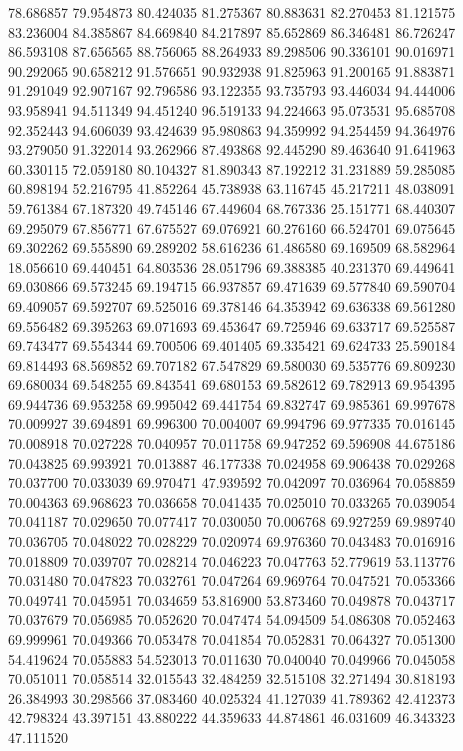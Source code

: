 78.686857
79.954873
80.424035
81.275367
80.883631
82.270453
81.121575
83.236004
84.385867
84.669840
84.217897
85.652869
86.346481
86.726247
86.593108
87.656565
88.756065
88.264933
89.298506
90.336101
90.016971
90.292065
90.658212
91.576651
90.932938
91.825963
91.200165
91.883871
91.291049
92.907167
92.796586
93.122355
93.735793
93.446034
94.444006
93.958941
94.511349
94.451240
96.519133
94.224663
95.073531
95.685708
92.352443
94.606039
93.424639
95.980863
94.359992
94.254459
94.364976
93.279050
91.322014
93.262966
87.493868
92.445290
89.463640
91.641963
60.330115
72.059180
80.104327
81.890343
87.192212
31.231889
59.285085
60.898194
52.216795
41.852264
45.738938
63.116745
45.217211
48.038091
59.761384
67.187320
49.745146
67.449604
68.767336
25.151771
68.440307
69.295079
67.856771
67.675527
69.076921
60.276160
66.524701
69.075645
69.302262
69.555890
69.289202
58.616236
61.486580
69.169509
68.582964
18.056610
69.440451
64.803536
28.051796
69.388385
40.231370
69.449641
69.030866
69.573245
69.194715
66.937857
69.471639
69.577840
69.590704
69.409057
69.592707
69.525016
69.378146
64.353942
69.636338
69.561280
69.556482
69.395263
69.071693
69.453647
69.725946
69.633717
69.525587
69.743477
69.554344
69.700506
69.401405
69.335421
69.624733
25.590184
69.814493
68.569852
69.707182
67.547829
69.580030
69.535776
69.809230
69.680034
69.548255
69.843541
69.680153
69.582612
69.782913
69.954395
69.944736
69.953258
69.995042
69.441754
69.832747
69.985361
69.997678
70.009927
39.694891
69.996300
70.004007
69.994796
69.977335
70.016145
70.008918
70.027228
70.040957
70.011758
69.947252
69.596908
44.675186
70.043825
69.993921
70.013887
46.177338
70.024958
69.906438
70.029268
70.037700
70.033039
69.970471
47.939592
70.042097
70.036964
70.058859
70.004363
69.968623
70.036658
70.041435
70.025010
70.033265
70.039054
70.041187
70.029650
70.077417
70.030050
70.006768
69.927259
69.989740
70.036705
70.048022
70.028229
70.020974
69.976360
70.043483
70.016916
70.018809
70.039707
70.028214
70.046223
70.047763
52.779619
53.113776
70.031480
70.047823
70.032761
70.047264
69.969764
70.047521
70.053366
70.049741
70.045951
70.034659
53.816900
53.873460
70.049878
70.043717
70.037679
70.056985
70.052620
70.047474
54.094509
54.086308
70.052463
69.999961
70.049366
70.053478
70.041854
70.052831
70.064327
70.051300
54.419624
70.055883
54.523013
70.011630
70.040040
70.049966
70.045058
70.051011
70.058514
32.015543
32.484259
32.515108
32.271494
30.818193
26.384993
30.298566
37.083460
40.025324
41.127039
41.789362
42.412373
42.798324
43.397151
43.880222
44.359633
44.874861
46.031609
46.343323
47.111520
